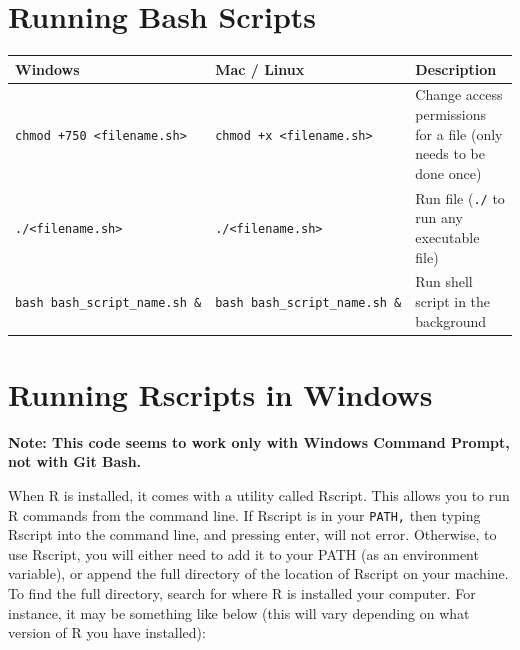 \documentclass[
]{book}
\newcounter{none} %
\begin{document}
\section{Running Bash Scripts}\label{running-bash-scripts}

{\def\LTcaptype{none} %
\begin{longtable}[]{@{}
  >{\raggedright\arraybackslash}p{}
  >{\raggedright\arraybackslash}p{}
  >{\raggedright\arraybackslash}p{}@{}}
\toprule\noalign{}
\begin{minipage}[b]{\linewidth}\raggedright
Windows
\end{minipage} & \begin{minipage}[b]{\linewidth}\raggedright
Mac / Linux
\end{minipage} & \begin{minipage}[b]{\linewidth}\raggedright
Description
\end{minipage} \\
\midrule\noalign{}
\endhead
\bottomrule\noalign{}
\endlastfoot
\texttt{chmod\ +750\ \textless{}filename.sh\textgreater{}} & \texttt{chmod\ +x\ \textless{}filename.sh\textgreater{}} & Change access permissions for a file (only needs to be done once) \\
\texttt{./\textless{}filename.sh\textgreater{}} & \texttt{./\textless{}filename.sh\textgreater{}} & Run file (\texttt{./} to run any executable file) \\
\texttt{bash\ bash\_script\_name.sh\ \&} & \texttt{bash\ bash\_script\_name.sh\ \&} & Run shell script in the background \\
\end{longtable}
}

\section{Running Rscripts in Windows}\label{running-rscripts-in-windows}

\textbf{Note: This code seems to work only with Windows Command Prompt, not with Git Bash.}

When R is installed, it comes with a utility called Rscript. This allows you to run R commands from the command line. If Rscript is in your \texttt{PATH,} then typing Rscript into the command line, and pressing enter, will not error. Otherwise, to use Rscript, you will either need to add it to your PATH (as an environment variable), or append the full directory of the location of Rscript on your machine. To find the full directory, search for where R is installed your computer. For instance, it may be something like below (this will vary depending on what version of R you have installed):
\end{document}
